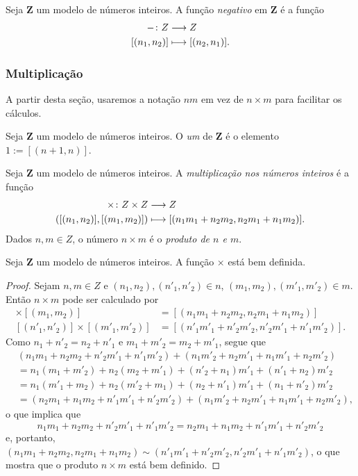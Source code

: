 \begin{definition}
	Seja $\bm Z$ um modelo de números inteiros. A função \emph{negativo} em $\bm Z$ é a função
	\begin{align*}
	{-}\colon {Z} &\longrightarrow {Z} \\{[(n_1,n_2)]} &\longmapsto [(n_2,n_1)].
	\end{align*}
\end{definition}


\subsubsection{Multiplicação}

A partir desta seção, usaremos a notação $nm$ em vez de $n \times m$ para facilitar os cálculos.

\begin{definition}
	Seja $\bm Z$ um modelo de números inteiros. O \emph{um} de $\bm Z$ é o elemento $1 := [(n+1,n)]$.
\end{definition}

\begin{definition}
Seja $\bm Z$ um modelo de números inteiros. A \emph{multiplicação nos números inteiros} é a função
	\begin{align*}
	{\times}\colon {Z \times Z} &\longrightarrow {Z} \\{([(n_1,n_2)],[(m_1,m_2)])} &\longmapsto [(n_1 m_1 + n_2 m_2,n_2 m_1+n_1 m_2)].
	\end{align*}
Dados $n,m \in Z$, o número $n \times m$ é o \emph{produto de $n$ e $m$}.
\end{definition}

\begin{theorem}
	Seja $\bm Z$ um modelo de números inteiros. A função $\times$ está bem definida.
\end{theorem}
\begin{proof}
	Sejam $n,m \in Z$ e $(n_1,n_2),(n'_1,n'_2) \in n$, $(m_1,m_2),(m'_1,m'_2) \in m$. Então $n \times m$ pode ser calculado por
\begin{align*}
	[(n_1,n_2)] \times [(m_1,m_2)] &= [(n_1 m_1 + n_2 m_2,n_2 m_1+n_1 m_2)] \\
	[(n'_1,n'_2)]\times [(m'_1,m'_2)] &= [(n'_1 m'_1 + n'_2 m'_2,n'_2 m'_1+n'_1 m'_2)].
	\end{align*}
Como $n_1+n'_2=n_2+n'_1$ e $m_1+m'_2=m_2+m'_1$, segue que
	\begin{align*}
	&(n_1 m_1 + n_2 m_2+n'_2 m'_1+n'_1 m'_2)+(n_1 m'_2 + n_2 m'_1 + n_1 m'_1+n_2 m'_2) \\
	&= n_1(m_1+m'_2)+n_2(m_2+m'_1)+(n'_2+n_1)m'_1+(n'_1+n_2)m'_2 \\
	&= n_1(m'_1+m_2)+n_2(m'_2+m_1)+(n_2+n'_1)m'_1+(n_1+n'_2)m'_2 \\
	&= (n_2 m_1+n_1 m_2+n'_1 m'_1 + n'_2 m'_2)+(n_1 m'_2 + n_2 m'_1 + n_1 m'_1+n_2 m'_2),
	\end{align*}
o que implica que
	\begin{equation*}
	n_1 m_1 + n_2 m_2+n'_2 m'_1+n'_1 m'_2=n_2 m_1+n_1 m_2+n'_1 m'_1 + n'_2 m'_2
	\end{equation*}
e, portanto, $(n_1 m_1 + n_2 m_2,n_2 m_1+n_1 m_2) \sim (n'_1 m'_1 + n'_2 m'_2,n'_2 m'_1+n'_1 m'_2)$, o que mostra que o produto $n \times m$ está bem definido.
\end{proof}


